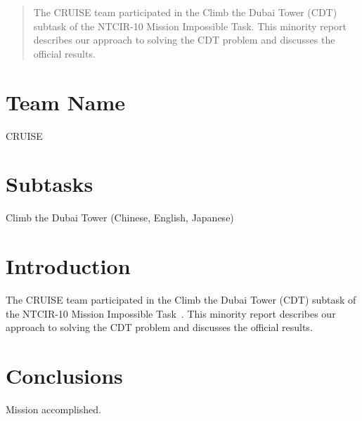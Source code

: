 \documentclass{sig-alternate}
\begin{document}
\begin{abstract}
The CRUISE team participated in the Climb the Dubai Tower (CDT) subtask of the NTCIR-10 Mission Impossible Task.
This minority report describes our approach to solving the CDT problem and discusses the official results.
\end{abstract}

\section*{Team Name}
CRUISE

\section*{Subtasks}
Climb the Dubai Tower (Chinese, English, Japanese)


\section{Introduction}

The CRUISE team participated in the Climb the Dubai Tower (CDT) subtask of the NTCIR-10 Mission Impossible Task~\cite{mioverview}.
This minority report describes our approach to solving the CDT problem and discusses the official results.

\section{Conclusions}

Mission accomplished.




\end{document}
